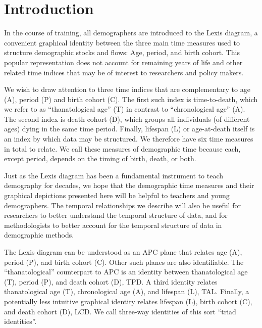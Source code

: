 \documentclass[12pt,oneside,a4paper]{article} %
\begin{document}
\section{Introduction}
In the course of training, all demographers are introduced
to the Lexis diagram, a convenient graphical identity between the three main
time measures used to structure demographic stocks and flows: Age, period, and birth cohort.
This popular representation does not account for remaining years of life and
other related time indices that may be of interest to researchers and
policy makers. %

We wish to draw attention to three time indices that are complementary to age
(A), period (P) and birth cohort (C). The first such index is time-to-death,
which we refer to as ``thanatological age'' (T) in contrast to ``chronological
age'' (A). The second index is death cohort (D), which groups all individuals
(of different ages) dying in the same time period. Finally, lifespan (L) or
age-at-death itself is an index by which data may be structured.
We therefore have six time measures in total to relate. We call these measures of demographic
time because each, except period, depends on the timing of birth, death, or
both.

Just as the Lexis diagram has been a fundamental instrument to
teach demography for decades, we hope that the demographic time measures and
their graphical depictions presented here will be helpful to teachers and
young demographers. The temporal relationships we describe will also be useful
for researchers to better understand the temporal structure of data, and for methodologists to
better account for the temporal structure of data in demographic methods.

The Lexis diagram can be understood as an APC plane
that relates age (A), period (P), and birth cohort (C). Other such planes are
also identifiable.
The ``thanatological'' counterpart to APC is an identity between thanatological age (T), period (P), and death cohort (D), TPD. A third identity
relates thanatological age (T), chronological age (A), and lifespan (L), TAL. Finally, a potentially less
intuitive graphical identity relates lifespan (L), birth cohort (C), and death
cohort (D), LCD. We call three-way identities of this sort ``triad identities''.
\end{document}

